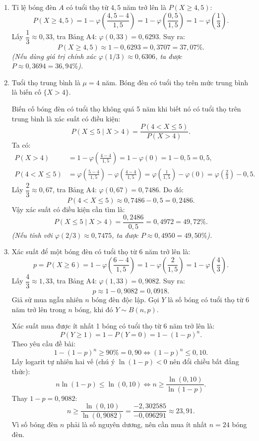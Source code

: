 \documentclass[12pt,a4paper]{article}
\theoremstyle{definition}
\begin{document}
\begin{enumerate}[label=\alph*.]
    \item Tỉ lệ bóng đèn $A$ có tuổi thọ từ $4{,}5$ năm trở lên là $P(X \ge 4{,}5)$:
    \[
    P(X \ge 4{,}5) = 1 - \varphi\left(\frac{4{,}5 - 4}{1{,}5}\right) = 1 - \varphi\left(\frac{0{,}5}{1{,}5}\right) = 1 - \varphi\left(\frac{1}{3}\right).
    \]
    Lấy $\dfrac{1}{3} \approx 0{,}33$, tra Bảng A4: $\varphi(0{,}33) = 0{,}6293$. Suy ra:
    \[
    P(X \ge 4{,}5) \approx 1 - 0{,}6293 = 0{,}3707 = 37{,}07\%.
    \]
    \textit{(Nếu dùng giá trị chính xác $\varphi(1/3) \approx 0{,}6306$, ta được $P \approx 0{,}3694 = 36{,}94\%$).}

    \item Tuổi thọ trung bình là $\mu = 4$ năm. Bóng đèn có tuổi thọ trên mức trung bình là biến cố $\{X > 4\}$.

    Biến cố bóng đèn có tuổi thọ không quá 5 năm khi biết nó có tuổi thọ trên trung bình là xác suất có điều kiện:
    \[
    P(X \le 5 \mid X > 4) = \frac{P(4 < X \le 5)}{P(X > 4)}.
    \]
    Ta có:
    \begin{align*}
    P(X > 4) &= 1 - \varphi\left(\frac{4 - 4}{1{,}5}\right) = 1 - \varphi(0) = 1 - 0{,}5 = 0{,}5, \\
    P(4 < X \le 5) &= \varphi\left(\frac{5 - 4}{1{,}5}\right) - \varphi\left(\frac{4 - 4}{1{,}5}\right) = \varphi\left(\frac{1}{1{,}5}\right) - \varphi(0) = \varphi\left(\frac{2}{3}\right) - 0{,}5.
    \end{align*}
    Lấy $\dfrac{2}{3} \approx 0{,}67$, tra Bảng A4: $\varphi(0{,}67) = 0{,}7486$. Do đó:
    \[
    P(4 < X \le 5) \approx 0{,}7486 - 0{,}5 = 0{,}2486.
    \]
    Vậy xác suất có điều kiện cần tìm là:
    \[
    P(X \le 5 \mid X > 4) = \frac{0{,}2486}{0{,}5} = 0{,}4972 = 49{,}72\%.
    \]
    \textit{(Nếu tính với $\varphi(2/3) \approx 0{,}7475$, ta được $P \approx 0{,}4950 = 49{,}50\%$).}

    \item Xác suất để một bóng đèn có tuổi thọ từ 6 năm trở lên là:
    \[
    p = P(X \ge 6) = 1 - \varphi\left(\frac{6 - 4}{1{,}5}\right) = 1 - \varphi\left(\frac{2}{1{,}5}\right) = 1 - \varphi\left(\frac{4}{3}\right).
    \]
    Lấy $\dfrac{4}{3} \approx 1{,}33$, tra Bảng A4: $\varphi(1{,}33) = 0{,}9082$. Suy ra:
    \[
    p \approx 1 - 0{,}9082 = 0{,}0918.
    \]
    Giả sử mua ngẫu nhiên $n$ bóng đèn độc lập. Gọi $Y$ là số bóng có tuổi thọ từ 6 năm trở lên trong $n$ bóng, khi đó $Y \sim B(n, p)$.

    Xác suất mua được ít nhất 1 bóng có tuổi thọ từ 6 năm trở lên là:
    \[
    P(Y \ge 1) = 1 - P(Y = 0) = 1 - (1 - p)^n.
    \]
    Theo yêu cầu đề bài:
    \[
    1 - (1 - p)^n \ge 90\% = 0{,}90 \iff (1 - p)^n \le 0{,}10.
    \]
    Lấy logarit tự nhiên hai vế (chú ý $\ln(1 - p) < 0$ nên đổi chiều bất đẳng thức):
    \[
    n \ln(1 - p) \le \ln(0{,}10) \iff n \ge \frac{\ln(0{,}10)}{\ln(1 - p)}.
    \]
    Thay $1 - p = 0{,}9082$:
    \[
    n \ge \frac{\ln(0{,}10)}{\ln(0{,}9082)} = \frac{-2{,}302585}{-0{,}096291} \approx 23{,}91.
    \]
    Vì số bóng đèn $n$ phải là số nguyên dương, nên cần mua ít nhất $n = 24$ bóng đèn.
    

\end{enumerate}
\end{document}
